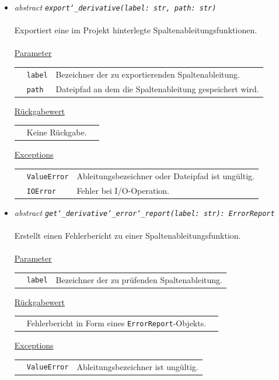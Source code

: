 \documentclass{article}
\begin{document}
\begin{itemize}
\item \textit{\flqq{}abstract\frqq} \texttt{\textit{export\char`_derivative(label: str, path: str)}}\\\\
Exportiert eine im Projekt hinterlegte Spaltenableitungsfunktionen.
\\\\
\underline{Parameter}\\
\begin{tabular}{lll}
 & \texttt{label} & Bezeichner der zu exportierenden Spaltenableitung.\\
 & \texttt{path} & Dateipfad an dem die Spaltenableitung gespeichert wird.\\
\end{tabular}

\underline{Rückgabewert}\\
\begin{tabular}{lll}
 & Keine Rückgabe.\\
\end{tabular}

\underline{Exceptions}\\
\begin{tabular}{lll}
 & \texttt{ValueError} & Ableitungsbezeichner oder Dateipfad ist ungültig.\\
 & \texttt{IOError} & Fehler bei I/O-Operation.\\
\end{tabular}


\item \textit{\flqq{}abstract\frqq} \texttt{\textit{get\char`_derivative\char`_error\char`_report(label: str): ErrorReport}}\\\\
Erstellt einen Fehlerbericht zu einer Spaltenableitungsfunktion.
\\\\
\underline{Parameter}\\
\begin{tabular}{lll}
 & \texttt{label} & Bezeichner der zu prüfenden Spaltenableitung.\\
\end{tabular}

\underline{Rückgabewert}\\
\begin{tabular}{lll}
 & Fehlerbericht in Form eines \texttt{ErrorReport}-Objekts.\\
\end{tabular}

\underline{Exceptions}\\
\begin{tabular}{lll}
 & \texttt{ValueError} & Ableitungsbezeichner ist ungültig.\\
\end{tabular}



\end{itemize}
\end{document}
